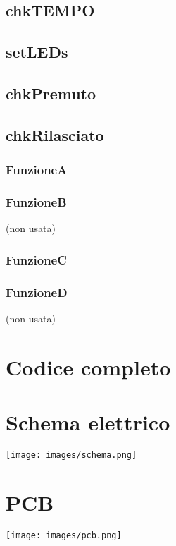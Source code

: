 \documentclass[DIV=24]{scrartcl}
\begin{document}
	\subsection{chkTEMPO}
    \begin{center}
        
    \end{center}
    \subsection{setLEDs}
    \begin{center}
        
    \end{center}       
    \subsection{chkPremuto}
    \begin{center}
        
    \end{center}    
    \subsection{chkRilasciato}
    \begin{center}
        
    \end{center}
    \subsubsection{FunzioneA}
                
    \subsubsection{FunzioneB}
        (non usata)
    \subsubsection{FunzioneC}
                
    \subsubsection{FunzioneD}
        (non usata)
    \section{Codice completo}
        
    \section{Schema elettrico}
    \texttt{[image: images/schema.png]}
    \section{PCB}
    \texttt{[image: images/pcb.png]}
\end{document}
